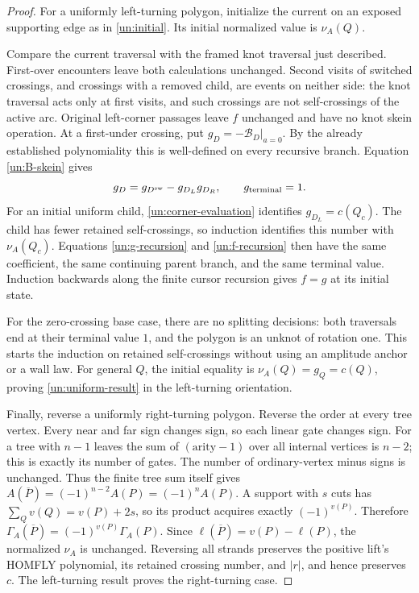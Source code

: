 \documentclass[11pt,letterpaper]{article}
\numberwithin{equation}{section}
\theoremstyle{definition}
\theoremstyle{remark}
\begin{document}
\begin{proof}
For a uniformly left-turning polygon, initialize the current on an
exposed supporting edge as in \eqref{un:initial}.  Its initial normalized
value is $\nu_A(Q)$.

Compare the current traversal with the framed knot traversal just
described.  First-over encounters leave both calculations unchanged.
Second visits of switched crossings, and crossings with a removed child,
are events on neither side: the knot traversal acts only at first visits,
and such crossings are not self-crossings of the active arc.
Original left-corner passages leave $f$ unchanged and have no knot
skein operation.  At a first-under crossing, put
$g_D=-\mathcal B_D|_{a=0}$.  By the already established polynomiality
this is well-defined on every recursive branch.  Equation
\eqref{un:B-skein} gives
\begin{equation}
 g_D=g_{D^{\rm sw}}-g_{D_L}g_{D_R},\qquad
 g_{\rm terminal}=1.
 \label{un:g-recursion}
\end{equation}
For an initial uniform child, \eqref{un:corner-evaluation} identifies
$g_{D_L}=c(Q_c)$.  The child has fewer retained self-crossings, so
induction identifies this number with $\nu_A(Q_c)$.  Equations
\eqref{un:g-recursion} and \eqref{un:f-recursion} then have the same
coefficient, the same continuing parent branch, and the same terminal
value.  Induction backwards along the finite cursor recursion gives
$f=g$ at its initial state.

For the zero-crossing base case, there are no splitting decisions:
both traversals end at their terminal value $1$, and the polygon is an
unknot of rotation one.  This starts the induction on retained
self-crossings without using an amplitude anchor or a wall law.
For general $Q$, the initial equality is
$\nu_A(Q)=g_Q=c(Q)$, proving \eqref{un:uniform-result} in the
left-turning orientation.

Finally, reverse a uniformly right-turning polygon. Reverse the order at
every tree vertex. Every near and far sign changes sign, so each linear
gate changes sign. For a tree with $n-1$ leaves the sum of
$(\text{arity}-1)$ over all internal vertices is $n-2$; this is exactly
its number of gates. The number of ordinary-vertex minus signs is
unchanged. Thus the finite tree sum itself gives
$A(\overline P)=(-1)^{n-2}A(P)=(-1)^nA(P)$.
A support with $s$ cuts has
$\sum_Qv(Q)=v(P)+2s$, so its product acquires exactly $(-1)^{v(P)}$.
Therefore $\Gamma_A(\overline P)=(-1)^{v(P)}\Gamma_A(P)$.
Since $\ell(\overline P)=v(P)-\ell(P)$, the normalized $\nu_A$ is unchanged.
Reversing all strands preserves the positive lift's HOMFLY polynomial,
its retained crossing number, and $|r|$, and hence preserves $c$.
The left-turning result proves the right-turning case.
\end{proof}
\end{document}

